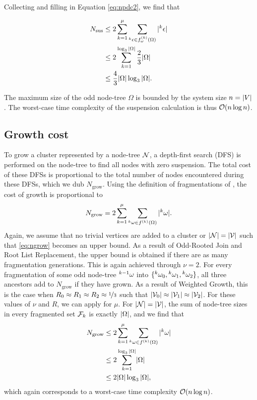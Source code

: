 Collecting  and filling in Equation \eqref{eq:npdc2}, we find that

\begin{align*}
  \nonumber N_{\text{sus}} &\leq 2\sum_{k=1}^\mu{ \sum_{  {}^{k} \epsilon \in f_\omega^{(k)}(\Omega) }{ \lvert {}^{k} \epsilon\rvert}  } \\
  \nonumber         &\leq 2\sum_{k=1}^{\log_3{\lvert\Omega\rvert}} \frac{2}{3}\lvert\Omega\rvert\\
                    &\leq \frac{4}{3}\lvert\Omega\rvert\log_3{\lvert\Omega\rvert}.
\end{align*}

The maximum size of the odd node-tree $\Omega$ is bounded by the system size $n = \lvert V\rvert$. The worst-case time complexity of the suspension calculation is thus $\mathcal{O}(n\log{n})$. 

\subsection{Growth cost}\label{sec:growthcost}

To grow a cluster represented by a node-tree $\mathcal{N}$, a depth-first search (DFS) is performed on the node-tree to find all nodes with zero suspension. The total cost of these DFSs is proportional to the total number of nodes encountered during these DFSs, which we dub $N_{\text{grow}}$. Using the definition of fragmentations of , the cost of growth is proportional to
\begin{equation}\label{eq:ngrow}
  N_{\text{grow}} = 2\sum_{k=1}^\mu{ \sum_{ \pre{k}\omega \in f^{(k)}(\Omega) }{ \abs{\pre{k}\omega}} }.
\end{equation}
Again, we assume that no trivial vertices are added to a cluster or $|\mathcal{N}| = |\mathcal{V}|$ such that \eqref{eq:ngrow} becomes an upper bound. As a result of Odd-Rooted Join and Root List Replacement, the upper bound is obtained if there are as many fragmentation generations. This is again achieved through $\nu = 2$. For every fragmentation of some odd node-tree ${}^{k-1}\omega$ into $\{{}^{k}\omega_0, {}^{k}\omega_1, {}^{k}\omega_2\}$, all three ancestors add to $N_{\text{grow}}$ if they have grown. As a result of Weighted Growth, this is the case when $R_0 \approx R_1 \approx R_2\approx \nicefrac{1}{3}$ such that $\lvert\mathcal{V}_0\rvert\approx \lvert\mathcal{V}_1\rvert\approx\lvert\mathcal{V}_2\rvert$. For these values of $\nu$ and $R$, we can apply  for $\mu$. For $|\mathcal{N}| = |\mathcal{V}|$, the sum of node-tree sizes in every fragmented set $\mathcal{F}_k$ is exactly $\lvert\Omega\rvert$, and we find that
\begin{align*}
  \nonumber N_{\text{grow}} &\leq 2\sum_{k=1}^\mu{ \sum_{  {}^{k} \omega \in f^{(k)}(\Omega) }{ \lvert {}^{k} \omega\rvert}  } \\
  \nonumber         &\leq 2\sum_{k=1}^{\log_3{\lvert\Omega\rvert}} \lvert\Omega\rvert\\
                    &\leq 2\lvert\Omega\rvert\log_3{\lvert\Omega\rvert},
\end{align*}
which again corresponds to a worst-case time complexity $\mathcal{O}(n\log{n})$.
